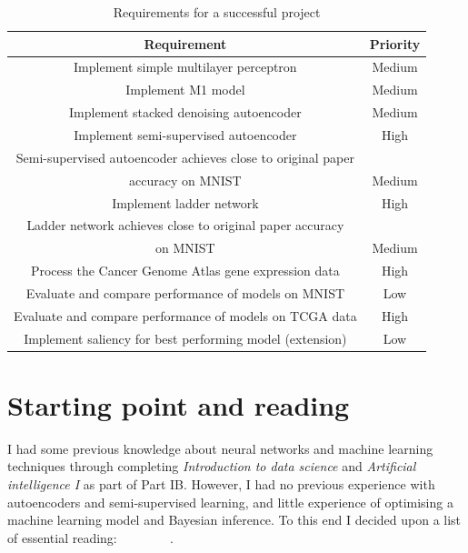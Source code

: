 \begin{table}[H]
  \label{tab:requirements}
  \small %
  \centering %
  \begin{tabular}{cc} %
  \toprule[\heavyrulewidth]\toprule[\heavyrulewidth]
  \textbf{Requirement} & \textbf{Priority} \\ 
  \midrule
  Implement simple multilayer perceptron & Medium \\
  Implement M1 model & Medium \\
  Implement stacked denoising autoencoder & Medium \\
  Implement semi-supervised autoencoder & High \\
  Semi-supervised autoencoder achieves close to original paper \\ accuracy on MNIST & Medium \\
  Implement ladder network & High \\
  Ladder network achieves close to original paper accuracy \\ on MNIST & Medium \\
  Process the Cancer Genome Atlas gene expression data & High \\
  Evaluate and compare performance of models on MNIST & Low \\
  Evaluate and compare performance of models on TCGA data & High \\
  Implement saliency for best performing model (extension) & Low \\
  \bottomrule[\heavyrulewidth] 
  \end{tabular}
  \caption{Requirements for a successful project} 
\end{table}

\section{Starting point and reading} \label{reading}

I had some previous knowledge about neural networks and machine learning techniques through completing \textit{Introduction to data science}
and \textit{Artificial intelligence I} as part of Part IB. However,
I had no previous experience with autoencoders and semi-supervised learning, and little experience of optimising 
a machine learning model and Bayesian inference. To this end I decided upon a list of essential reading:~\cite{ML_Bayes}~\cite{Goodfellow-et-al-2016}
~\cite{DBLP:journals/corr/KingmaW13}~\cite{DBLP:journals/corr/KingmaRMW14}~\cite{Vincent:2010:SDA:1756006.1953039}
~\cite{DBLP:journals/corr/Valpola14}~\cite{DBLP:journals/corr/RasmusVHBR15}.

